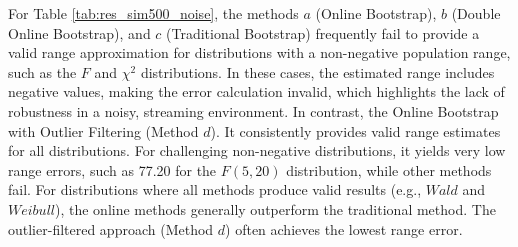 \documentclass[a4paper,fleqn]{cas-dc}
\begin{document}
For Table \ref{tab:res_sim500_noise}, the methods $a$ (Online Bootstrap), $b$ (Double Online Bootstrap), 
and $c$ (Traditional Bootstrap) frequently fail to provide a valid range approximation for distributions 
with a non-negative population range, such as the $F$ and $\chi^2$ distributions. In these cases, the 
estimated range includes negative values, making the error calculation invalid, which highlights the 
lack of robustness in a noisy, streaming environment. In contrast, the Online Bootstrap with Outlier Filtering 
(Method $d$). %
It consistently provides valid range estimates for all distributions. For challenging non-negative 
distributions, it yields very low range errors, such as 77.20 for the $F(5,20)$ distribution, while 
other methods fail. For distributions where all methods produce valid results (e.g., $Wald$ and $Weibull$), 
the online methods generally outperform the traditional method. 
The outlier-filtered approach (Method $d$) often achieves the lowest range error.
\end{document}
